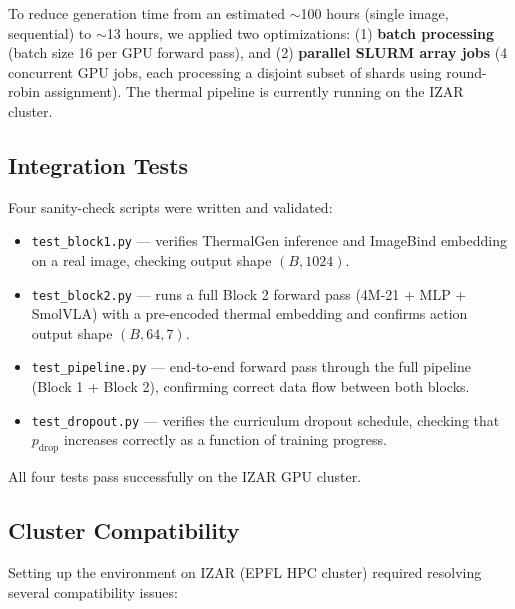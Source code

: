\documentclass[10pt,conference,compsocconf]{IEEEtran}
\begin{document}
To reduce generation time from an estimated $\sim$100 hours (single image, sequential) to $\sim$13 hours, we applied two optimizations: (1) \textbf{batch processing} (batch size 16 per GPU forward pass), and (2) \textbf{parallel SLURM array jobs} (4 concurrent GPU jobs, each processing a disjoint subset of shards using round-robin assignment). The thermal pipeline is currently running on the IZAR cluster.

\subsection{Integration Tests}

Four sanity-check scripts were written and validated:

\begin{itemize}
    \item \texttt{test\_block1.py} — verifies ThermalGen inference and ImageBind embedding on a real image, checking output shape $(B, 1024)$.
    \item \texttt{test\_block2.py} — runs a full Block 2 forward pass (4M-21 + MLP + SmolVLA) with a pre-encoded thermal embedding and confirms action output shape $(B, 64, 7)$.
    \item \texttt{test\_pipeline.py} — end-to-end forward pass through the full pipeline (Block 1 + Block 2), confirming correct data flow between both blocks.
    \item \texttt{test\_dropout.py} — verifies the curriculum dropout schedule, checking that $p_{\text{drop}}$ increases correctly as a function of training progress.
\end{itemize}

All four tests pass successfully on the IZAR GPU cluster.

\subsection{Cluster Compatibility}

Setting up the environment on IZAR (EPFL HPC cluster) required resolving several compatibility issues:
\end{document}
